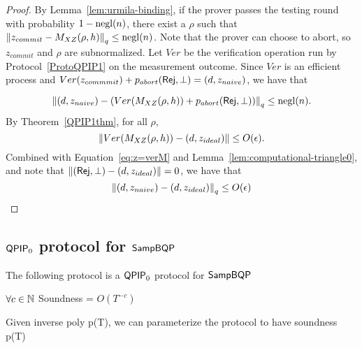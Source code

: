 \begin{proof}
By Lemma~\ref{lem:urmila-binding}, if the prover passes the testing round with probability $1-\operatorname{negl}(n)$, there exist a $\rho$ such that $\left\lVert z_{commit}- M_{XZ}(\rho,h)\right\rVert_q \leq \operatorname{negl}(n)$. Note that the prover can choose to abort, so $z_{commit}$ and $\rho$ are subnormalized. Let $Ver$ be the verification operation run by Protocol~\ref{ProtoQPIP1} on the measurement outcome.  Since $Ver$ is an efficient process and $Ver(z_{commmit})+p_{abort}(\mathsf{Rej},\bot)=(d,z_{naive})$, we have that 

\begin{equation} \label{eq:z=verM}
    \left\lVert(d,z_{naive})-(Ver( M_{XZ}(\rho,h))+p_{abort}(\mathsf{Rej},\bot))\right\rVert_q \leq \operatorname{negl}(n).
\end{equation}
 By Theorem~\ref{QPIP1thm}, for all $\rho$, 
 \begin{equation}
     \left\lVert Ver(M_{XZ}(\rho,h))-(d,z_{ideal})\right\rVert \leq O(\epsilon).
 \end{equation}
   Combined with Equation~\ref{eq:z=verM} and Lemma~\ref{lem:computational-triangle0}, and note that $\left\lVert(\mathsf{Rej},\bot)-(d,z_{ideal})\right\rVert=0$, we have that
   \begin{equation}
       \left\lVert(d,z_{naive})-(d,z_{ideal})\right\rVert_q\leq O(\epsilon)
   \end{equation}
\end{proof}


\subsection{$\operatorname{\mathsf{QPIP}}_0$ protocol for $\operatorname{\mathsf{SampBQP}}$} \label{sec:qpip0}


The following protocol is a $\operatorname{\mathsf{QPIP}}_0$ protocol for $\operatorname{\mathsf{SampBQP}}$

$\forall c\in\mathbb{N}$ Soundness = $O(T^{-c})$

Given inverse poly p(T), we can parameterize the protocol to have soundness p(T)




